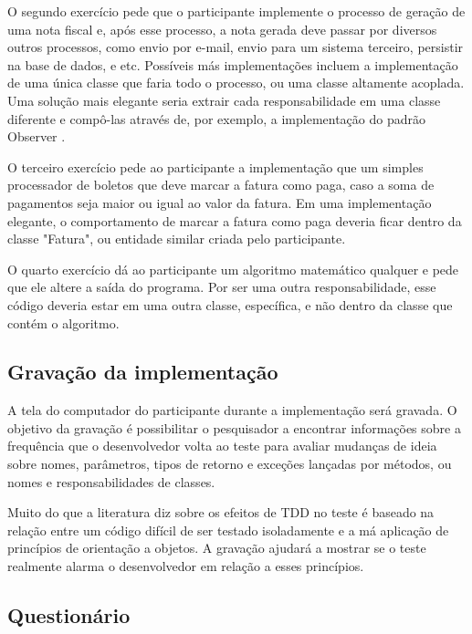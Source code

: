 O segundo exercício pede que o participante implemente o processo de geração de uma nota fiscal e, após
esse processo, a nota gerada deve passar por diversos outros processos, como envio por e-mail, envio
para um sistema terceiro, persistir na base de dados, e etc. Possíveis más implementações incluem a 
implementação de uma única classe que faria todo o processo, ou uma classe altamente acoplada.
Uma solução mais elegante seria extrair cada responsabilidade em uma classe diferente e compô-las
através de, por exemplo, a implementação do padrão Observer \cite{gof}.

O terceiro exercício pede ao participante a implementação que um simples processador de boletos que
deve marcar a fatura como paga, caso a soma de pagamentos seja maior ou igual ao valor da fatura. 
Em uma implementação elegante, o comportamento de marcar a fatura como paga deveria ficar dentro
da classe "Fatura", ou entidade similar criada pelo participante.

O quarto exercício dá ao participante um algoritmo matemático qualquer e pede que ele altere a saída
do programa. Por ser uma outra responsabilidade, esse código deveria estar em uma outra classe, específica,
e não dentro da classe que contém o algoritmo.

\subsection{Gravação da implementação}
\label{sec:planejamento-gravacao}

A tela do computador do participante durante a implementação será gravada. 
O objetivo da gravação é possibilitar o pesquisador a encontrar informações
sobre a frequência que o desenvolvedor volta ao teste para avaliar mudanças de ideia sobre
nomes, parâmetros, tipos de retorno e exceções lançadas por métodos, ou nomes
e responsabilidades de classes.

Muito do que a literatura diz sobre os efeitos de TDD no teste é baseado
na relação entre um código difícil de ser testado isoladamente e a má aplicação
de princípios de orientação a objetos. A gravação ajudará a mostrar se o teste
realmente alarma o desenvolvedor em relação a esses princípios.

\subsection{Questionário}
\label{sec:questionario}

